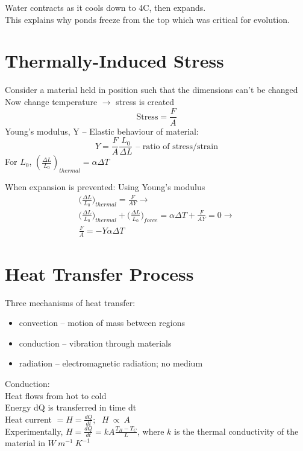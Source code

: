 \documentclass[a4paper, 11pt, fleqn, normalem]{report}
\begin{document}
Water contracts as it cools down to 4{\textdegree}C, then expands. \\
This explains why ponds freeze from the top which was critical for evolution.

\section{Thermally-Induced Stress}
Consider a material held in position such that the dimensions can't be changed\\
Now change temperature $\rightarrow$ stress is created
\begin{equation*}
	\text{Stress} = \frac{F}{A}
\end{equation*}
Young's modulus, Y -- Elastic behaviour of material:
\begin{equation*}
	Y = \frac{F}{A}\frac{L_{0}}{{\Delta}L} \text{ -- ratio of stress/strain}
\end{equation*}
For $L_{0}$, $(\frac{{\Delta}L}{L_{0}})_{thermal} = \alpha{\Delta}T$

When expansion is prevented: Using Young's modulus
\begin{gather*}
	\bigg(\frac{{\Delta}L}{L_{0}}\bigg)_{thermal} = \frac{F}{AY} \rightarrow \\
	\bigg(\frac{{\Delta}L}{L_{0}}\bigg)_{thermal} + \bigg(\frac{{\Delta}L}{L_{0}}\bigg)_{force} = \alpha{\Delta}T + \frac{F}{AY} = 0 \rightarrow \\
	\frac{F}{A} = -Y\alpha{\Delta}T
\end{gather*}

\section{Heat Transfer Process}
Three mechanisms of heat transfer:
\begin{itemize}
	\item convection -- motion of mass between regions
	\item conduction -- vibration through materials
	\item radiation -- electromagnetic radiation; no medium
\end{itemize}
Conduction: \\
Heat flows from hot to cold \\
Energy dQ is transferred in time dt \\
Heat current $= H = \frac{dQ}{dt} \text{; }~~ H~\propto~A$ \\
Experimentally, $H = \frac{dQ}{dt} = kA\frac{T_{H}-T_{C}}{L}$, where $k$ is the thermal conductivity of the material in $W~m^{-1}~K^{-1}$
\end{document}
